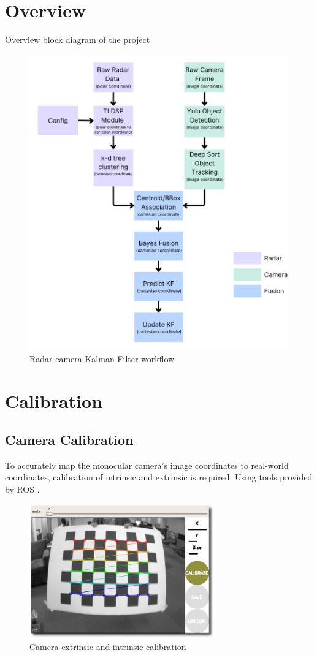 \section{Overview}\label{sec:2-overview}
Overview block diagram of the project  
\begin{figure}[hpbt]
    \centering
    \includegraphics[width=12cm]{Figures/kf_update-modified.png}%
    \caption{Radar camera Kalman Filter workflow}
    \label{fig:kf_update}
\end{figure}

\section{Calibration}\label{sec:2-calibration}
\subsection{Camera Calibration}
To accurately map the monocular camera's image coordinates to real-world coordinates, calibration of intrinsic and extrinsic is required.
Using tools provided by ROS \cite{cam_calib}.

\begin{figure}[hpbt]
    \centering
    \includegraphics[width=8cm]{Figures/cam_calib.png}%
    \caption{Camera extrinsic and intrinsic calibration}
    \label{fig:camera_calibration}
\end{figure}

